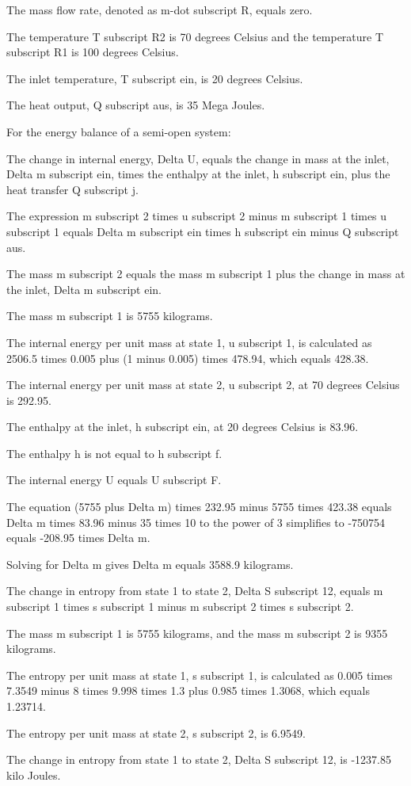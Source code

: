 The mass flow rate, denoted as m-dot subscript R, equals zero.

The temperature T subscript R2 is 70 degrees Celsius and the temperature T subscript R1 is 100 degrees Celsius.

The inlet temperature, T subscript ein, is 20 degrees Celsius.

The heat output, Q subscript aus, is 35 Mega Joules.

For the energy balance of a semi-open system:

The change in internal energy, Delta U, equals the change in mass at the inlet, Delta m subscript ein, times the enthalpy at the inlet, h subscript ein, plus the heat transfer Q subscript j.

The expression m subscript 2 times u subscript 2 minus m subscript 1 times u subscript 1 equals Delta m subscript ein times h subscript ein minus Q subscript aus.

The mass m subscript 2 equals the mass m subscript 1 plus the change in mass at the inlet, Delta m subscript ein.

The mass m subscript 1 is 5755 kilograms.

The internal energy per unit mass at state 1, u subscript 1, is calculated as 2506.5 times 0.005 plus (1 minus 0.005) times 478.94, which equals 428.38.

The internal energy per unit mass at state 2, u subscript 2, at 70 degrees Celsius is 292.95.

The enthalpy at the inlet, h subscript ein, at 20 degrees Celsius is 83.96.

The enthalpy h is not equal to h subscript f.

The internal energy U equals U subscript F.

The equation (5755 plus Delta m) times 232.95 minus 5755 times 423.38 equals Delta m times 83.96 minus 35 times 10 to the power of 3 simplifies to -750754 equals -208.95 times Delta m.

Solving for Delta m gives Delta m equals 3588.9 kilograms.

The change in entropy from state 1 to state 2, Delta S subscript 12, equals m subscript 1 times s subscript 1 minus m subscript 2 times s subscript 2.

The mass m subscript 1 is 5755 kilograms, and the mass m subscript 2 is 9355 kilograms.

The entropy per unit mass at state 1, s subscript 1, is calculated as 0.005 times 7.3549 minus 8 times 9.998 times 1.3 plus 0.985 times 1.3068, which equals 1.23714.

The entropy per unit mass at state 2, s subscript 2, is 6.9549.

The change in entropy from state 1 to state 2, Delta S subscript 12, is -1237.85 kilo Joules.